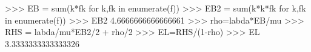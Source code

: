 
>>> EB = sum(k*fk for k,fk in enumerate(f))
>>> EB2 = sum(k*k*fk for k,fk in enumerate(f))
>>> EB2
4.6666666666666661
>>> rho=labda*EB/mu
>>> RHS = labda/mu*EB2/2 + rho/2
>>> EL=RHS/(1-rho)
>>> EL
3.3333333333333326

